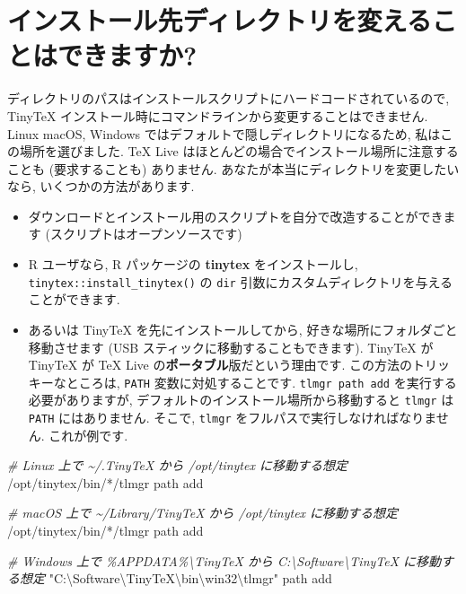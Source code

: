 \documentclass[
  xelatex,ja=standard,jafont=noto]{bxjsreport}
\newenvironment{Shaded}{\begin{snugshade}}{\end{snugshade}}
\newcommand{\CommentTok}[1]{\textcolor[rgb]{0.56,0.35,0.01}{\textit{#1}}}
\newcommand{\ExtensionTok}[1]{#1}
\newcommand{\NormalTok}[1]{#1}
\newcommand{\StringTok}[1]{\textcolor[rgb]{0.31,0.60,0.02}{#1}}
\begin{document}
\hypertarget{change-directory}{%
\section{インストール先ディレクトリを変えることはできますか?}\label{change-directory}}

ディレクトリのパスはインストールスクリプトにハードコードされているので,
TinyTeX インストール時にコマンドラインから変更することはできません.
Linux macOS, Windows ではデフォルトで隠しディレクトリになるため,
私はこの場所を選びました. TeX Live
はほとんどの場合でインストール場所に注意することも (要求することも)
ありません. あなたが本当にディレクトリを変更したいなら,
いくつかの方法があります.

\begin{itemize}
\item
  ダウンロードとインストール用のスクリプトを自分で改造することができます
  (スクリプトはオープンソースです)
\item
  R ユーザなら, R パッケージの \textbf{tinytex} をインストールし,
  \texttt{tinytex::install\_tinytex()} の \texttt{dir}
  引数にカスタムディレクトリを与えることができます.
\item
  あるいは TinyTeX を先にインストールしてから,
  好きな場所にフォルダごと移動させます (USB
  スティックに移動することもできます). TinyTeX が TinyTeX が TeX Live
  の\textbf{ポータブル}版だという理由です.
  この方法のトリッキーなところは, \texttt{PATH} 変数に対処することです.
  \texttt{tlmgr\ path\ add} を実行する必要がありますが,
  デフォルトのインストール場所から移動すると \texttt{tlmgr} は
  \texttt{PATH} にはありません. そこで, \texttt{tlmgr}
  をフルパスで実行しなければなりません. これが例です.
\end{itemize}

\begin{Shaded}
\begin{Highlighting}[]
\CommentTok{\# Linux 上で \textasciitilde{}/.TinyTeX から /opt/tinytex に移動する想定}
\ExtensionTok{/opt/tinytex/bin/*/tlmgr}\NormalTok{ path add}

\CommentTok{\# macOS 上で \textasciitilde{}/Library/TinyTeX から /opt/tinytex に移動する想定}
\ExtensionTok{/opt/tinytex/bin/*/tlmgr}\NormalTok{ path add}

\CommentTok{\# Windows 上で \%APPDATA\%\textbackslash{}TinyTeX から C:\textbackslash{}Software\textbackslash{}TinyTeX に移動する想定}
\StringTok{"C:\textbackslash{}Software\textbackslash{}TinyTeX\textbackslash{}bin\textbackslash{}win32\textbackslash{}tlmgr"}\NormalTok{ path add}
\end{Highlighting}
\end{Shaded}
\end{document}
